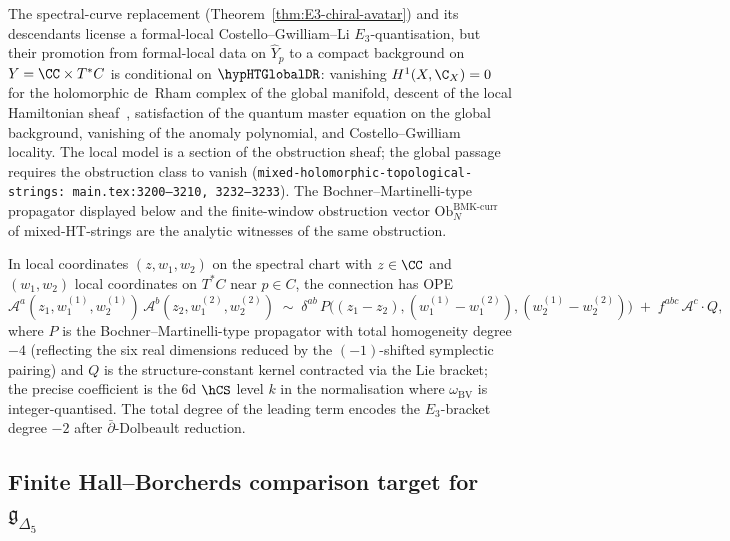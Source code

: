 \begin{remark}
\label{rem:ht-global-de-rham-bv-ht-physics}
The spectral-curve replacement
(Theorem~\ref{thm:E3-chiral-avatar}) and its descendants license a
formal-local Costello--Gwilliam--Li $E_3$-quantisation, but their
promotion from formal-local data on $\widehat{Y}_p$ to a compact
background on $Y = \CC\times T^*C$ is conditional on
$\hypHTGlobalDR$: vanishing $H^1(X,\C_X) = 0$ for the holomorphic
de~Rham complex of the global manifold, descent of the local
Hamiltonian sheaf~\cite[\S4--5]{CG17}, satisfaction of the quantum
master equation on the global background, vanishing of the anomaly
polynomial, and Costello--Gwilliam locality. The local model is a
section of the obstruction sheaf; the global passage requires the
obstruction class to vanish (\texttt{mixed-holomorphic-topological-strings:%
main.tex:3200--3210, 3232--3233}). The Bochner--Martinelli-type
propagator displayed below and the finite-window obstruction vector
$\mathrm{Ob}^{\mathrm{BMK\mbox{-}curr}}_N$ of mixed-HT-strings are the
analytic witnesses of the same obstruction.
\end{remark}

\begin{remark}
In local coordinates $(z,w_1,w_2)$ on the spectral chart with $z\in\CC$
and $(w_1,w_2)$ local coordinates on $T^*C$ near $p\in C$, the
connection has OPE
\[
\mathcal{A}^a(z_1,w_1^{(1)},w_2^{(1)})\,\mathcal{A}^b(z_2,w_1^{(2)},w_2^{(2)})
\;\sim\;
\delta^{ab}\,P\bigl((z_1-z_2),(w_1^{(1)}-w_1^{(2)}),(w_2^{(1)}-w_2^{(2)})\bigr)
\;+\;
f^{abc}\,\mathcal{A}^c\cdot Q,
\]
where $P$ is the Bochner--Martinelli-type propagator with total
homogeneity degree $-4$ (reflecting the six real dimensions reduced
by the $(-1)$-shifted symplectic pairing) and $Q$ is the
structure-constant kernel contracted via the Lie bracket; the precise
coefficient is the 6d $\hCS$ level $k$ in the normalisation where
$\omega_{\mathrm{BV}}$ is integer-quantised. The total degree of the
leading term encodes the $E_3$-bracket degree $-2$ after
$\bar\partial$-Dolbeault reduction.
\end{remark}

\subsection{Finite Hall--Borcherds comparison target for $\mathfrak{g}_{\Delta_5}$}
\label{subsec:E3-Delta5}

